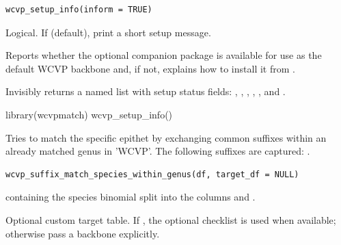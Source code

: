 \documentclass[a4paper]{book}
\begin{document}
%
\begin{Description}
\strong{[Stable]}
\end{Description}
%
\begin{Usage}
\begin{verbatim}
wcvp_setup_info(inform = TRUE)
\end{verbatim}
\end{Usage}
%
\begin{Arguments}
\begin{ldescription}
\item[\code{inform}] Logical. If  (default), print a short setup message.
\end{ldescription}
\end{Arguments}
%
\begin{Details}
Reports whether the optional companion package  is available for
use as the default WCVP backbone and, if not, explains how to install it
from .
\end{Details}
%
\begin{Value}
Invisibly returns a named list with setup status fields:
, ,
, , , and
.
\end{Value}
%
\begin{Examples}
\begin{ExampleCode}
library(wcvpmatch)
wcvp_setup_info()
\end{ExampleCode}
\end{Examples}
%
\begin{Description}
\strong{[Stable]}

Tries to match the specific epithet by exchanging common suffixes within an already matched genus in 'WCVP'.
The following suffixes are captured: .
\end{Description}
%
\begin{Usage}
\begin{verbatim}
wcvp_suffix_match_species_within_genus(df, target_df = NULL)
\end{verbatim}
\end{Usage}
%
\begin{Arguments}
\begin{ldescription}
\item[\code{df}]  containing the species binomial split into the columns  and .

\item[\code{target\_df}] Optional custom target table. If , the optional  checklist is used when available; otherwise pass a backbone explicitly.
\end{ldescription}
\end{Arguments}
\end{document}
